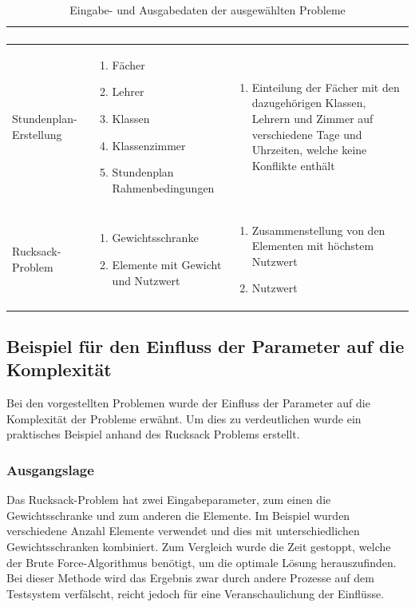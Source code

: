 \begin{table}[ht]
\begin{tabular}{ p{3cm} | p{5.4cm} | p{5.4cm} }
\begin{enumerate}
							   \end{enumerate}	\\ \hline
	Stundenplan-Erstellung			& \begin{enumerate}
								\item Fächer
								\item Lehrer
								\item Klassen
								\item Klassenzimmer
								\item Stundenplan Rahmenbedingungen
							   \end{enumerate}				
							&  \begin{enumerate}
								\item  Einteilung der Fächer mit den dazugehörigen Klassen, Lehrern und Zimmer auf verschiedene Tage und Uhrzeiten, welche keine 
									Konflikte enthält
							   \end{enumerate}	\\ \hline
	Rucksack-Problem				& \begin{enumerate}
								\item Gewichtsschranke
								\item Elemente mit Gewicht und Nutzwert
							   \end{enumerate}				
							&  \begin{enumerate}
								\item Zusammenstellung von den Elementen mit höchstem Nutzwert
								\item Nutzwert
							   \end{enumerate}	\\ \hline
  \end{tabular}
   \caption{Eingabe- und Ausgabedaten der ausgewählten Probleme}\label{table:input_output}
\end{table}

\newpage
\subsection{Beispiel für den Einfluss der Parameter auf die Komplexität \resultAssignment{[R1a]}}\label{example_complexity_knapsack}
Bei den vorgestellten Problemen wurde der Einfluss der Parameter auf die Komplexität der Probleme erwähnt. Um dies zu verdeutlichen wurde ein praktisches Beispiel anhand des Rucksack 
Problems erstellt.

\subsubsection{Ausgangslage}
Das Rucksack-Problem hat zwei Eingabeparameter, zum einen die Gewichtsschranke und zum anderen die Elemente. Im Beispiel wurden verschiedene Anzahl Elemente verwendet und dies mit 
unterschiedlichen Gewichtsschranken kombiniert. Zum Vergleich wurde die Zeit gestoppt, welche der Brute Force-Algorithmus benötigt, um die optimale Lösung herauszufinden. Bei dieser 
Methode wird das Ergebnis zwar durch andere Prozesse auf dem Testsystem verfälscht, reicht jedoch für eine Veranschaulichung der Einflüsse.

